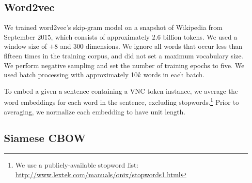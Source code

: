 \documentclass[11pt,a4paper]{article}
\begin{document}
\subsection{Word2vec}\label{word2vec}
%
%

We trained word2vec's skip-gram model \citep{mikolov+:2013b} on a
snapshot of Wikipedia from September 2015, which consists of
approximately 2.6 billion tokens. We used a window size of $\pm$8 and
300 dimensions. We ignore all words that occur less than fifteen times
in the training corpus, and did not set a maximum vocabulary size. We
perform negative sampling and set the number of training epochs to
five. We used batch processing with approximately 10$k$ words in each
batch.
	

To embed a given a sentence containing a VNC token instance, we
average the word embeddings for each word in the sentence, excluding
stopwords.\footnote{We use a publicly-available stopword list:
  \url{http://www.lextek.com/manuals/onix/stopwords1.html}} Prior to
averaging, we normalize each embedding to have unit length.


\subsection{Siamese CBOW}

\end{document}
